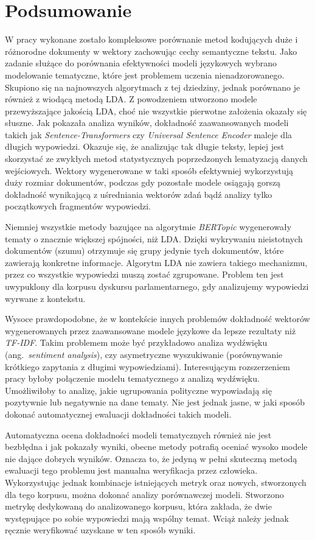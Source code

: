 
\chapter{Podsumowanie}
	W pracy wykonane zostało kompleksowe porównanie metod kodujących duże i różnorodne dokumenty w wektory zachowując cechy semantyczne tekstu.
	Jako zadanie służące do porównania efektywności modeli językowych wybrano modelowanie tematyczne, które jest problemem uczenia nienadzorowanego.
	Skupiono się na najnowszych algorytmach z tej dziedziny, jednak porównano je również z wiodącą metodą LDA\@.
	Z powodzeniem utworzono modele przewyższające jakością LDA, choć nie wszystkie pierwotne założenia okazały się słuszne.
	Jak pokazała analiza wyników, dokładność zaawansowanych modeli takich jak \emph{Sentence-Transformers} czy \emph{Universal Sentence Encoder}
		maleje dla długich wypowiedzi.
	Okazuje się, że analizując tak długie teksty, lepiej jest skorzystać ze zwykłych metod statystycznych poprzedzonych lematyzacją danych wejściowych.
	Wektory wygenerowane w taki sposób efektywniej wykorzystują duży rozmiar dokumentów,
		podczas gdy pozostałe modele osiągają gorszą dokładność wynikającą z uśredniania wektorów zdań bądź analizy tylko początkowych fragmentów wypowiedzi.
	
	Niemniej wszystkie metody bazujące na algorytmie \emph{BERTopic} wygenerowały tematy o znacznie większej spójności, niż LDA\@.
	Dzięki wykrywaniu nieistotnych dokumentów (szumu) otrzymuje się grupy jedynie tych dokumentów, które zawierają konkretne informacje.
	Algorytm LDA nie zawiera takiego mechanizmu, przez co wszystkie wypowiedzi muszą zostać zgrupowane.
	Problem ten jest uwypuklony dla korpusu dyskursu parlamentarnego, gdy analizujemy wypowiedzi wyrwane z kontekstu.
	
	Wysoce prawdopodobne, że w kontekście innych problemów dokładność wektorów wygenerowanych przez zaawansowane modele językowe da lepsze rezultaty niż \emph{TF-IDF}.
	Takim problemem może być przykładowo analiza wydźwięku (ang.\ \emph{sentiment analysis}), czy asymetryczne wyszukiwanie (porównywanie krótkiego zapytania z długimi wypowiedziami).
	Interesującym rozszerzeniem pracy byłoby połączenie modelu tematycznego z analizą wydźwięku.
	Umożliwiłoby to analizę, jakie ugrupowania polityczne wypowiadają się pozytywnie lub negatywnie na dane tematy.
	Nie jest jednak jasne, w jaki sposób dokonać automatycznej ewaluacji dokładności takich modeli.

	Automatyczna ocena dokładności modeli tematycznych również nie jest bezbłędna i jak pokazały wyniki, obecne metody potrafią oceniać wysoko modele nie dające dobrych wyników.
	Oznacza to, że jedyną w pełni skuteczną metodą ewaluacji tego problemu jest manualna weryfikacja przez człowieka.
	Wykorzystując jednak kombinacje istniejących metryk oraz nowych, stworzonych dla tego korpusu, można dokonać analizy porównawczej modeli.
	Stworzono metrykę dedykowaną do analizowanego korpusu, która zakłada, że dwie występujące po sobie wypowiedzi mają wspólny temat.
	Wciąż należy jednak ręcznie weryfikować uzyskane w ten sposób wyniki.

